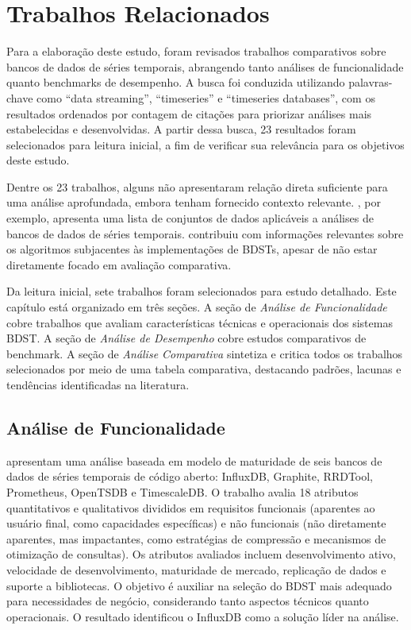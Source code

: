 \section{Trabalhos Relacionados}
\label{sec:related}

Para a elaboração deste estudo, foram revisados trabalhos comparativos sobre bancos de dados de
séries temporais, abrangendo tanto análises de funcionalidade quanto benchmarks de desempenho.
A busca foi conduzida utilizando palavras-chave como ``data streaming'', ``timeseries'' e
``timeseries databases'', com os resultados ordenados por contagem de citações para priorizar
análises mais estabelecidas e desenvolvidas. A partir dessa busca, 23 resultados foram
selecionados para leitura inicial, a fim de verificar sua relevância para os objetivos deste estudo.

Dentre os 23 trabalhos, alguns não apresentaram relação direta suficiente para uma análise
aprofundada, embora tenham fornecido contexto relevante. \cite{zubaroglu2021data}, por exemplo,
apresenta uma lista de conjuntos de dados aplicáveis a análises de bancos de dados de séries
temporais. \cite{Gaber2005Mining} contribuiu com informações relevantes sobre os algoritmos
subjacentes às implementações de BDSTs, apesar de não estar diretamente focado em avaliação
comparativa.

Da leitura inicial, sete trabalhos foram selecionados para estudo detalhado. Este capítulo está
organizado em três seções. A seção de \textit{Análise de Funcionalidade} cobre trabalhos que
avaliam características técnicas e operacionais dos sistemas BDST. A seção de \textit{Análise
de Desempenho} cobre estudos comparativos de benchmark. A seção de \textit{Análise Comparativa}
sintetiza e critica todos os trabalhos selecionados por meio de uma tabela comparativa,
destacando padrões, lacunas e tendências identificadas na literatura.

\subsection{Análise de Funcionalidade}

\cite{Petre2019} apresentam uma análise baseada em modelo de maturidade de seis bancos de dados
de séries temporais de código aberto: InfluxDB, Graphite, RRDTool, Prometheus, OpenTSDB e
TimescaleDB. O trabalho avalia 18 atributos quantitativos e qualitativos divididos em requisitos
funcionais (aparentes ao usuário final, como capacidades específicas) e não funcionais (não
  diretamente aparentes, mas impactantes, como estratégias de compressão e mecanismos de otimização
de consultas). Os atributos avaliados incluem desenvolvimento ativo, velocidade de desenvolvimento,
maturidade de mercado, replicação de dados e suporte a bibliotecas. O objetivo é auxiliar na
seleção do BDST mais adequado para necessidades de negócio, considerando tanto aspectos técnicos
quanto operacionais. O resultado identificou o InfluxDB como a solução líder na análise.

